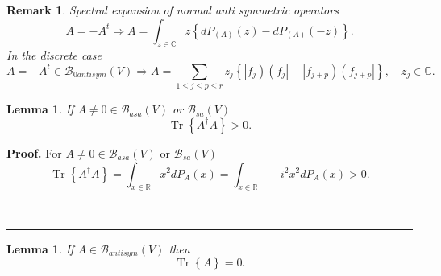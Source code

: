\documentclass[aps,preprint]{revtex4}%
\newtheorem{lemma}[theorem]{Lemma}
\newtheorem{remark}[theorem]{Remark}
\newenvironment{proof}[1][Proof]{\noindent\textbf{#1.} }{\ \rule{0.5em}{0.5em}}
\begin{document}
\begin{remark}
Spectral expansion of normal anti symmetric operators
\begin{equation}
A=-A^{t}\Rightarrow A=\int_{z\in\mathbb{C}}z\left\{  dP_{\left(  A\right)
}\left(  z\right)  -dP_{\left(  A\right)  }\left(  -z\right)  \right\}  .
\end{equation}
In the discrete case
\begin{equation}
A=-A^{t}\in\mathcal{B}_{0antisym}\left(  V\right)  \Rightarrow A=\sum_{1\leq
j\leq p\leq r}z_{j}\left\{  \left\vert f_{j}\right)  \left(  f_{j}\right\vert
-\left\vert f_{j+p}\right)  \left(  f_{j+p}\right\vert \right\}  ,\quad
z_{j}\in\mathbb{C}.
\end{equation}

\end{remark}

\begin{lemma}
If $A\neq0\in\mathcal{B}_{asa}\left(  V\right)  $ or $\mathcal{B}_{sa}\left(
V\right)  $%
\begin{equation}
\operatorname{Tr}\left\{  A^{\dagger}A\right\}  >0.
\end{equation}

\end{lemma}

\begin{proof}
For $A\neq0\in\mathcal{B}_{asa}\left(  V\right)  $ or $\mathcal{B}_{sa}\left(
V\right)  $%
\begin{equation}
\operatorname{Tr}\left\{  A^{\dagger}A\right\}  =\int_{x\in\mathbb{R}}%
x^{2}dP_{A}\left(  x\right)  =\int_{x\in\mathbb{R}}-i^{2}x^{2}dP_{A}\left(
x\right)  >0.
\end{equation}

\end{proof}

\begin{lemma}
If $A\in\mathcal{B}_{antisym}\left(  V\right)  $ then
\begin{equation}
\operatorname{Tr}\left\{  A\right\}  =0.
\end{equation}

\end{lemma}
\end{document}

